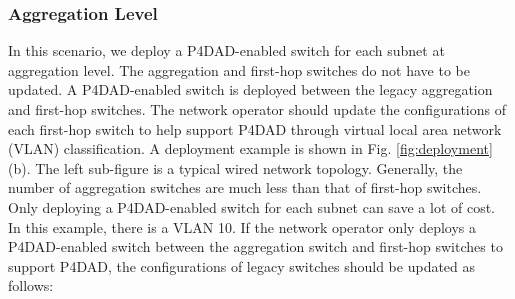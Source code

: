 \documentclass[journal]{IEEEtran}
\begin{document}
        \subsubsection{Aggregation Level}\label{sec:aggregation}
            In this scenario, we deploy a P4DAD-enabled switch for each subnet at aggregation level. The aggregation and first-hop switches do not have to be updated. A P4DAD-enabled switch is deployed between the legacy aggregation and first-hop switches. The network operator should update the configurations of each first-hop switch to help support P4DAD through virtual local area network (VLAN) classification. A deployment example is shown in Fig. \ref{fig:deployment} (b). The left sub-figure is a typical wired network topology. Generally, the number of aggregation switches are much less than that of first-hop switches. Only deploying a P4DAD-enabled switch for each subnet can save a lot of cost. In this example, there is a VLAN 10. If the network operator only deploys a P4DAD-enabled switch between the aggregation switch and first-hop switches to support P4DAD, the configurations of legacy switches should be updated as follows:
\end{document}
